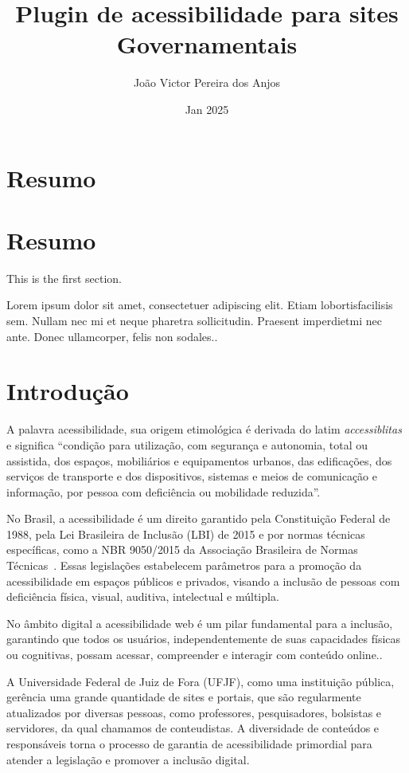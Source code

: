 \documentclass[12pt]{article}
\title{Plugin de acessibilidade para sites Governamentais}
\author{João Victor Pereira dos Anjos}
\date{Jan 2025}
\begin{document}
\maketitle
  
\tableofcontents

\section{Resumo}

\section{Resumo}
   
This is the first section.
      
Lorem  ipsum  dolor  sit  amet,  consectetuer  adipiscing  
elit.   Etiam  lobortisfacilisis sem.  Nullam nec mi et 
neque pharetra sollicitudin.  Praesent imperdietmi nec ante. 
Donec ullamcorper, felis non sodales..

\section{Introdução}

A palavra acessibilidade, sua origem etimológica é derivada do latim \textit{accessiblitas} 
e significa ``condição para utilização, com segurança e autonomia, 
total ou assistida, dos espaços, mobiliários e equipamentos urbanos, das 
edificações, dos serviços de transporte e dos dispositivos, sistemas e meios de
comunicação e informação, por pessoa com deficiência ou mobilidade reduzida''\cite{Acessibilidade}.

No Brasil, a acessibilidade é um direito garantido pela Constituição 
Federal de 1988, pela Lei Brasileira de Inclusão (LBI) de 2015 \Cite{LBI}
e por normas técnicas específicas, como a NBR 9050/2015 da Associação 
Brasileira de Normas Técnicas~\cite{ABNT}. Essas legislações estabelecem 
parâmetros para a promoção da acessibilidade em espaços públicos e privados,
visando a inclusão de pessoas com deficiência física, visual, auditiva, 
intelectual e múltipla.

No âmbito digital a acessibilidade web é um pilar fundamental para a 
inclusão, garantindo que todos os usuários, independentemente de suas
capacidades físicas ou cognitivas, possam acessar, compreender e interagir com
conteúdo online.\cite{wcag22}. 

A Universidade Federal de Juiz de Fora (UFJF), como uma instituição pública,
gerência uma grande quantidade de sites e portais, que são regularmente
atualizados por diversas pessoas, como professores, pesquisadores, bolsistas e
servidores, da qual chamamos de conteudistas. A diversidade de conteúdos e
responsáveis torna o processo de garantia de acessibilidade primordial para
atender a legislação e promover a inclusão digital.
\end{document}
